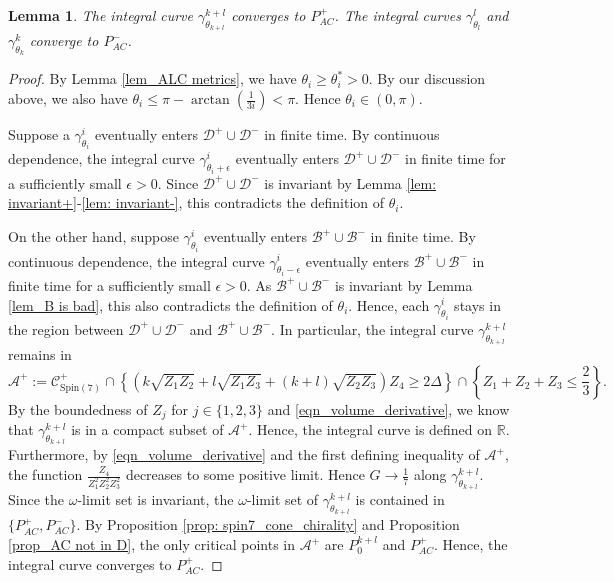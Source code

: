 \documentclass[11pt,letterpaper]{amsart}
\newtheorem{lemma}[theorem]{Lemma}
\theoremstyle{definition}
\numberwithin{equation}{section}
\newcommand{\spin}{\mathrm{Spin}}
\begin{document}
\begin{lemma}
\label{lem_AC metrics}
The integral curve $\gamma_{\theta_{k+l}}^{k+l}$ converges to $P_{AC}^+$. The integral curves $\gamma_{\theta_l}^{l}$ and $\gamma_{\theta_k}^{k}$ converge to $P_{AC}^-$.
\end{lemma}
\begin{proof}
By Lemma \ref{lem_ALC metrics}, we have $\theta_i\geq \theta_i^*>0$.  By our discussion above, we also have $\theta_i\leq \pi-\arctan\left(\frac{1}{3i}\right)<\pi$. Hence $\theta_i\in(0,\pi)$.

Suppose a $\gamma_{\theta_i}^i$ eventually enters $\mathcal{D}^+\cup\mathcal{D}^-$ in finite time. By continuous dependence, the integral curve $\gamma_{\theta_i+\epsilon}^i$ eventually enters $\mathcal{D}^+\cup\mathcal{D}^-$ in finite time for a sufficiently small $\epsilon>0$. Since $\mathcal{D}^+\cup\mathcal{D}^-$ is invariant by Lemma \ref{lem: invariant+}-\ref{lem: invariant-}, this contradicts the definition of $\theta_i$. 

On the other hand, suppose $\gamma_{\theta_i}^i$ eventually enters $\mathcal{B}^+\cup\mathcal{B}^-$ in finite time. By continuous dependence, the integral curve $\gamma_{\theta_i-\epsilon}^i$ eventually enters $\mathcal{B}^+\cup\mathcal{B}^-$ in finite time for a sufficiently small $\epsilon>0$. As $\mathcal{B}^+\cup\mathcal{B}^-$ is invariant by Lemma \ref{lem_B is bad}, this also contradicts the definition of $\theta_i$. Hence, each $\gamma_{\theta_i}^i$ stays in the region between $\mathcal{D}^+\cup\mathcal{D}^-$ and $\mathcal{B}^+\cup\mathcal{B}^-$. In particular, the integral curve $\gamma_{\theta_{k+l}}^{k+l}$ remains in 
$$
\mathcal{A}^+:=\mathcal{C}_{\spin(7)}^+\cap \left\{\left(k\sqrt{Z_1Z_2}+l\sqrt{Z_1Z_3}+(k+l)\sqrt{Z_2Z_3}\right)Z_4\geq 2\Delta\right\}\cap \left\{Z_1+Z_2+Z_3\leq \frac{2}{3}\right\}.
$$
By the boundedness of $Z_j$ for $j\in\{1,2,3\}$ and \eqref{eqn_volume_derivative}, we know that $\gamma_{\theta_{k+l}}^{k+l}$ is in a compact subset of $\mathcal{A}^+$. Hence, the integral curve is defined on $\mathbb{R}$. Furthermore, by \eqref{eqn_volume_derivative} and the first defining inequality of $\mathcal{A}^+$, the function $\frac{Z_4}{Z_1^2Z_2^2Z_3^2}$ decreases to some positive limit. Hence $G\rightarrow \frac{1}{7}$ along $\gamma_{\theta_{k+l}}^{k+l}$. Since the $\omega$-limit set is invariant, the $\omega$-limit set of $\gamma_{\theta_{k+l}}^{k+l}$ is contained in $\{P_{AC}^+, P_{AC}^-\}$. By Proposition \ref{prop: spin7_cone_chirality} and Proposition \ref{prop_AC not in D}, the only critical points in $\mathcal{A}^+$ are $P_0^{k+l}$ and $P_{AC}^+$. Hence, the integral curve converges to $P_{AC}^+$.


\end{proof}
\end{document}
